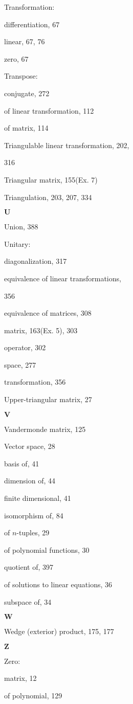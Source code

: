Transformation:

differentiation, 67

linear, 67, 76

zero, 67

Transpose:

conjugate, 272

of linear transformation, 112

of matrix, 114

Triangulable linear transformation, 202,

316

Triangular matrix, 155(Ex. 7)

Triangulation, 203, 207, 334

\(\mathbf{U}\)

Union, 388

Unitary:

diagonalization, 317

equivalence of linear transformations,

356

equivalence of matrices, 308

matrix, 163(Ex. 5), 303

operator, 302

space, 277

transformation, 356

Upper-triangular matrix, 27

\(\mathbf{V}\)

Vandermonde matrix, 125

Vector space, 28

basis of, 41

dimension of, 44

finite dimensional, 41

isomorphism of, 84

of \(n\)-tuples, 29

of polynomial functions, 30

quotient of, 397

of solutions to linear equations, 36

subspace of, 34

\(\mathbf{W}\)

Wedge (exterior) product, 175, 177

\(\mathbf{Z}\)

Zero:

matrix, 12

of polynomial, 129 